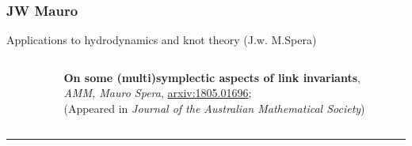 \documentclass[handout,10pt]{beamer}
\newcommand{\extrarule}{
		{
			\color{UniGreen}
			\par\hspace*{-\dimexpr0.5\paperwidth-0.5\textwidth}\rule[0.5\baselineskip]{\paperwidth}{0.4pt}
			\vspace{-2em}
		}
}
\begin{document}
\subsubsection{JW Mauro}
	\begin{frame}[t]{Applications to hydrodynamics and knot theory \small(J.w. M.Spera)}

		\begin{columns}
			\begin{column}[T]{0.2\textwidth}
				\centering
			\end{column}		
			\begin{column}[T]{0.8\textwidth}
				\vspace{-.25em}
				\begin{center}
					\textbf{On some (multi)symplectic aspects of link invariants}, \\ 
					\emph{AMM, Mauro Spera}, \href{https://arXiv.org/abs/1805.01696}{arxiv:1805.01696};\\
					(Appeared in \emph{Journal of the Australian Mathematical Society})	
				\end{center}			
			\end{column}		
		\end{columns}	
		\extrarule
	

\end{frame}
\end{document}

